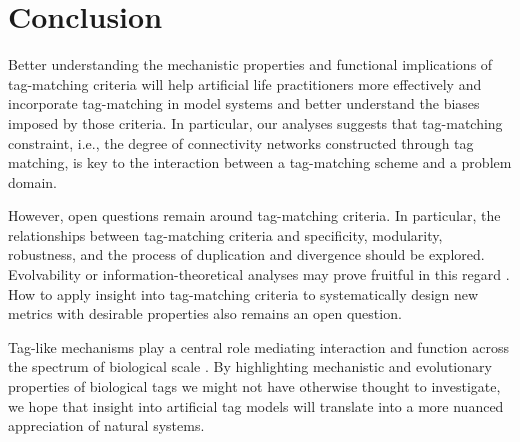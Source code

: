 \section{Conclusion}

Better understanding the mechanistic properties and functional implications of tag-matching criteria will help artificial life practitioners more effectively and incorporate tag-matching in model systems and better understand the biases imposed by those criteria.
In particular, our analyses suggests that tag-matching constraint, i.e., the degree of connectivity networks constructed through tag matching, is key to the interaction between a tag-matching scheme and a problem domain.

However, open questions remain around tag-matching criteria.
In particular, the relationships between tag-matching criteria and specificity, modularity, robustness, and the process of duplication and divergence should be explored. 
Evolvability or information-theoretical analyses may prove fruitful in this regard \citep{tarapore2015evolvability}.
How to apply insight into tag-matching criteria to systematically design new metrics with desirable properties also remains an open question.

Tag-like mechanisms play a central role mediating interaction and function across the spectrum of biological scale \citep{holland2012signals}.
By highlighting mechanistic and evolutionary properties of biological tags we might not have otherwise thought to investigate, we hope that insight into artificial tag models will translate into a more nuanced appreciation of natural systems.
